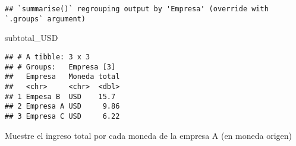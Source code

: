 \documentclass[]{article}
\newenvironment{Shaded}{\begin{snugshade}}{\end{snugshade}}
\newcommand{\DataTypeTok}[1]{\textcolor[rgb]{0.13,0.29,0.53}{#1}}
\newcommand{\KeywordTok}[1]{\textcolor[rgb]{0.13,0.29,0.53}{\textbf{#1}}}
\newcommand{\NormalTok}[1]{#1}
\newcommand{\OperatorTok}[1]{\textcolor[rgb]{0.81,0.36,0.00}{\textbf{#1}}}
\newcommand{\OtherTok}[1]{\textcolor[rgb]{0.56,0.35,0.01}{#1}}
\newcommand{\StringTok}[1]{\textcolor[rgb]{0.31,0.60,0.02}{#1}}
\begin{document}
\begin{Shaded}
\end{Shaded}

\begin{verbatim}
## `summarise()` regrouping output by 'Empresa' (override with `.groups` argument)
\end{verbatim}

\begin{Shaded}
\begin{Highlighting}[]
\NormalTok{subtotal_USD}
\end{Highlighting}
\end{Shaded}

\begin{verbatim}
## # A tibble: 3 x 3
## # Groups:   Empresa [3]
##   Empresa   Moneda total
##   <chr>     <chr>  <dbl>
## 1 Empesa B  USD    15.7 
## 2 Empresa A USD     9.86
## 3 Empresa C USD     6.22
\end{verbatim}

Muestre el ingreso total por cada moneda de la empresa A (en moneda
origen)

\begin{Shaded}
\end{Shaded}
\end{document}
